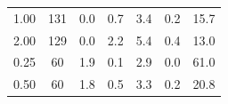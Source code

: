 \documentclass[12pt,a4paper]{article}
\begin{document}
\begin{table}[ht!]
\begin{tabular}{|c|c|c|c|c|c|c|}
1.00                                                                                                 & 131                                                                                    & 0.0                                                                                     & 0.7                                                                                    & 3.4                                                                                     & 0.2                                                                                      & 15.7                                                                 \\
2.00                                                                                                 & 129                                                                                    & 0.0                                                                                     & 2.2                                                                                    & 5.4                                                                                     & 0.4                                                                                      & 13.0                                                                 \\ \hline
0.25                                                                                                 & 60                                                                                     & 1.9                                                                                     & 0.1                                                                                    & 2.9                                                                                     & 0.0                                                                                      & 61.0                                                                 \\
0.50                                                                                                 & 60                                                                                     & 1.8                                                                                     & 0.5                                                                                    & 3.3                                                                                     & 0.2                                                                                      & 20.8                                                                 \\

\end{tabular}
\end{table}
\end{document}

